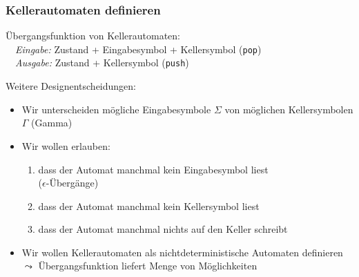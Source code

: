 \documentclass[onlymath]{beamer}
\begin{document}
\begin{frame}\frametitle{Kellerautomaten definieren}

\alert{Übergangsfunktion von Kellerautomaten:}\\
~~\emph{Eingabe:} Zustand + Eingabesymbol + Kellersymbol (\texttt{pop})\\
~~\emph{Ausgabe:} Zustand + Kellersymbol (\texttt{push})
\bigskip\pause

\alert{Weitere Designentscheidungen:}
\begin{itemize}
\item Wir unterscheiden mögliche Eingabesymbole $\Sigma$ von möglichen Kellersymbolen $\Gamma$ (Gamma)\\
%
\pause
\item Wir wollen erlauben:
\begin{enumerate}[(1)]
\item dass der Automat manchmal kein Eingabesymbol liest\\
($\epsilon$-Übergänge)\pause
\item dass der Automat manchmal kein Kellersymbol liest
\pause
\item dass der Automat manchmal nichts auf den Keller schreibt
\pause
\end{enumerate}
%
\item Wir wollen Kellerautomaten als nichtdeterministische Automaten definieren\\
$\leadsto$ Übergangsfunktion liefert Menge von Möglichkeiten
\end{itemize}

\end{frame}
\end{document}
